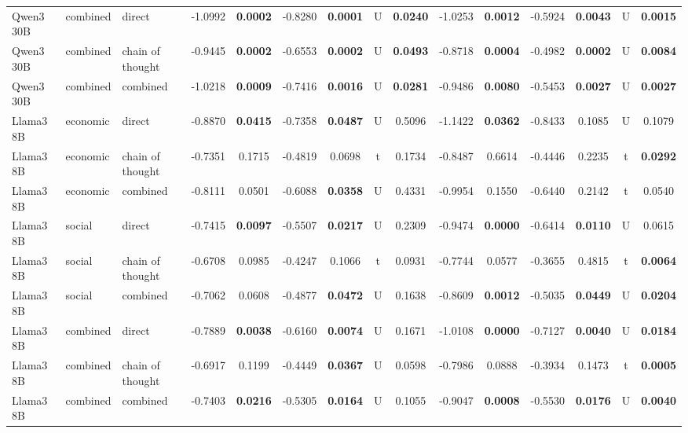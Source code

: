 \begin{center}
\begin{longtable}{@{}lll|cccccc|cccccc@{}}
        Qwen3 30B & combined & direct & -1.0992 & \textbf{0.0002} & -0.8280 & \textbf{0.0001} & U & \textbf{0.0240} & -1.0253 & \textbf{0.0012} & -0.5924 & \textbf{0.0043} & U & \textbf{0.0015} \\
        Qwen3 30B & combined & chain of thought & -0.9445 & \textbf{0.0002} & -0.6553 & \textbf{0.0002} & U & \textbf{0.0493} & -0.8718 & \textbf{0.0004} & -0.4982 & \textbf{0.0002} & U & \textbf{0.0084} \\
        \rowcolor{gray!20} Qwen3 30B & combined & combined & -1.0218 & \textbf{0.0009} & -0.7416 & \textbf{0.0016} & U & \textbf{0.0281} & -0.9486 & \textbf{0.0080} & -0.5453 & \textbf{0.0027} & U & \textbf{0.0027} \\
        Llama3 8B & economic & direct & -0.8870 & \textbf{0.0415} & -0.7358 & \textbf{0.0487} & U & 0.5096 & -1.1422 & \textbf{0.0362} & -0.8433 & 0.1085 & U & 0.1079 \\
        Llama3 8B & economic & chain of thought & -0.7351 & 0.1715 & -0.4819 & 0.0698 & t & 0.1734 & -0.8487 & 0.6614 & -0.4446 & 0.2235 & t & \textbf{0.0292} \\
        Llama3 8B & economic & combined & -0.8111 & 0.0501 & -0.6088 & \textbf{0.0358} & U & 0.4331 & -0.9954 & 0.1550 & -0.6440 & 0.2142 & t & 0.0540 \\
        Llama3 8B & social & direct & -0.7415 & \textbf{0.0097} & -0.5507 & \textbf{0.0217} & U & 0.2309 & -0.9474 & \textbf{0.0000} & -0.6414 & \textbf{0.0110} & U & 0.0615 \\
        Llama3 8B & social & chain of thought & -0.6708 & 0.0985 & -0.4247 & 0.1066 & t & 0.0931 & -0.7744 & 0.0577 & -0.3655 & 0.4815 & t & \textbf{0.0064} \\
        Llama3 8B & social & combined & -0.7062 & 0.0608 & -0.4877 & \textbf{0.0472} & U & 0.1638 & -0.8609 & \textbf{0.0012} & -0.5035 & \textbf{0.0449} & U & \textbf{0.0204} \\
        Llama3 8B & combined & direct & -0.7889 & \textbf{0.0038} & -0.6160 & \textbf{0.0074} & U & 0.1671 & -1.0108 & \textbf{0.0000} & -0.7127 & \textbf{0.0040} & U & \textbf{0.0184} \\
        Llama3 8B & combined & chain of thought & -0.6917 & 0.1199 & -0.4449 & \textbf{0.0367} & U & 0.0598 & -0.7986 & 0.0888 & -0.3934 & 0.1473 & t & \textbf{0.0005} \\
        \rowcolor{gray!20} Llama3 8B & combined & combined & -0.7403 & \textbf{0.0216} & -0.5305 & \textbf{0.0164} & U & 0.1055 & -0.9047 & \textbf{0.0008} & -0.5530 & \textbf{0.0176} & U & \textbf{0.0040} \\

\end{longtable}
\end{center}
